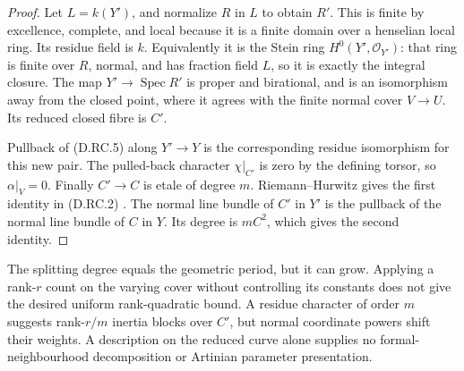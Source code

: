 \begin{proof}
Let $L=k(Y')$, and normalize $R$ in $L$ to obtain $R'$.
This is finite by excellence, complete, and local because
it is a finite domain over a henselian local ring.  Its
residue field is $k$.  Equivalently it is the Stein ring
$H^0(Y',\mathcal O_{Y'})$: that ring is finite over $R$,
normal, and has fraction field $L$, so it is exactly the
integral closure.  The map $Y'\to\operatorname{Spec}R'$
is proper and birational, and is an isomorphism away from
the closed point, where it agrees with the finite normal
cover $V\to U$.  Its reduced closed fibre is $C'$.

Pullback of (D.RC.5) along $Y'\to Y$ is the corresponding
residue isomorphism for this new pair.  The pulled-back
character $\chi|_{C'}$ is zero by the defining torsor, so
$\alpha|_V=0$.  Finally $C'\to C$ is etale of degree $m$.
Riemann--Hurwitz gives the first identity in (D.RC.2)
\citep[Lemma~53.12.2, Tag 0C1D]{StacksSingleCurveBrauerD}.
The normal line bundle of $C'$ in $Y'$ is the pullback of
the normal line bundle of $C$ in $Y$.  Its degree is $mC^2$,
which gives the second identity.
\end{proof}

\begin{remark}
The splitting degree equals the geometric period, but it
can grow.  Applying a rank-$r$ count on the varying cover
without controlling its constants does not give the desired
uniform rank-quadratic bound.  A residue character of order
$m$ suggests rank-$r/m$ inertia blocks over $C'$, but normal
coordinate powers shift their weights.  A description on
the reduced curve alone supplies no formal-neighbourhood
decomposition or Artinian parameter presentation.
\end{remark}
